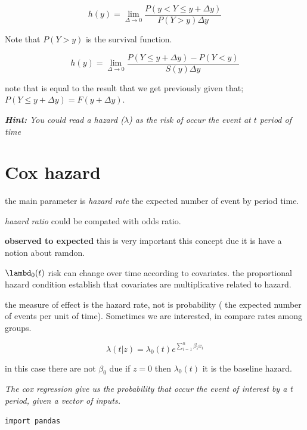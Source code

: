 \documentclass[10pt,a4paper]{article}
\begin{document}
\begin{equation}
h(y) = \lim_{\Delta \to 0}  \frac{ P(y<Y \leq y + \Delta y) }{P(Y>y)\Delta y}
\end{equation}

Note that $P(Y>y)$ is the survival function.

\begin{equation}
h(y) = \lim_{\Delta \to 0}  \frac{P(Y \leq y + \Delta y ) - P(Y < y)}{S(y)\Delta y }
\end{equation}

note that is equal to the result that we get previously given that; $P(Y \leq y + \Delta y ) = F(y+\Delta y)$.


 \emph{ \textbf{Hint:}  You could read a hazard ($\lambda$) as the risk of occur the event at $t$ period of time}


\section{Cox hazard}
the main parameter is \textit{hazard rate} the expected number of event by period time.

\textit{hazard ratio} could be compated with odds ratio.

\textbf{observed to expected} this is very important this concept due 
it is have a notion about ramdon.

$\lambd_{0}(t)$  risk can change over time according to covariates.
the proportional hazard condition establish that covariates are multiplicative related to 
hazard. 

the measure of effect is the hazard rate, not is probability ( the expected number of events per unit of time).  Sometimes we are interested, in compare rates among groups. 


$$\lambda(t|z)= \lambda_{0}(t) e^{\sum_{i=1}^{n} \beta_{i} x_{i}}$$

in this case there are not $\beta_{0}$ due if $z=0$ then $\lambda_{0}(t)$ it is the baseline hazard.




\emph{The cox regression give us the probability that occur the event of interest by a t period, given a vector of inputs.}


\begin{lstlisting}
import pandas
\end{lstlisting}
\end{document}
